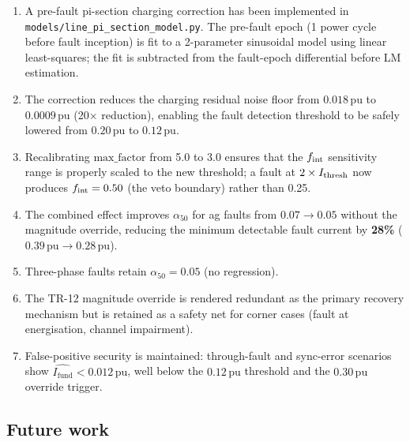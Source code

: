 \documentclass[11pt,a4paper]{article}
\newcommand{\Ifund}{I_{\mathrm{fund}}}
\newcommand{\alphafifty}{\alpha_{50}}
\newcommand{\pu}{\,\text{pu}}
\begin{document}
\begin{enumerate}
  \item A pre-fault pi-section charging correction has been implemented in
        \texttt{models/line\_pi\_section\_model.py}.  The pre-fault epoch
        (1 power cycle before fault inception) is fit to a 2-parameter
        sinusoidal model using linear least-squares; the fit is subtracted
        from the fault-epoch differential before LM estimation.
  \item The correction reduces the charging residual noise floor from
        $0.018\pu$ to $0.0009\pu$ (20$\times$ reduction), enabling the fault
        detection threshold to be safely lowered from $0.20\pu$ to $0.12\pu$.
  \item Recalibrating $\mathrm{max\_factor}$ from 5.0 to 3.0 ensures that the
        $f_{\rm int}$ sensitivity range is properly scaled to the new
        threshold; a fault at $2\times I_{\rm thresh}$ now produces
        $f_{\rm int} = 0.50$ (the veto boundary) rather than 0.25.
  \item The combined effect improves $\alphafifty$ for ag faults from
        $0.07 \to 0.05$ without the magnitude override, reducing the minimum
        detectable fault current by \textbf{28\%}
        ($0.39\pu \to 0.28\pu$).
  \item Three-phase faults retain $\alphafifty = 0.05$ (no regression).
  \item The TR-12 magnitude override is rendered redundant as the primary
        recovery mechanism but is retained as a safety net for corner cases
        (fault at energisation, channel impairment).
  \item False-positive security is maintained: through-fault and sync-error
        scenarios show $\hat{\Ifund} < 0.012\pu$, well below the $0.12\pu$
        threshold and the $0.30\pu$ override trigger.
\end{enumerate}

\subsection*{Future work}
\end{document}
